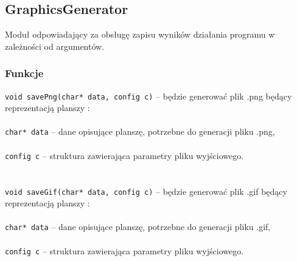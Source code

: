 \documentclass{article}
\begin{document}
\subsection{GraphicsGenerator}
Moduł odpowiadający za obsługę zapisu wyników działania programu w zależności od argumentów.

\subsubsection{Funkcje}
\texttt{void savePng(char* data, config c)} -- będzie generować plik .png będący reprezentacją planszy :\\\\
	 \hspace*{10mm}\texttt{char* data} -- dane opisujące planszę, potrzebne do generacji pliku .png,\\\\
	  \hspace*{10mm}\texttt{config c} -- struktura zawierająca parametry pliku wyjściowego.\\\\
\\
\texttt{void saveGif(char* data, config c)} -- będzie generować plik .gif będący reprezentacją planszy :\\\\
	 \hspace*{10mm}\texttt{char* data} -- dane opisujące planszę, potrzebne do generacji pliku .gif,\\\\
	  \hspace*{10mm}\texttt{config c} -- struktura zawierająca parametry pliku wyjściowego.\\\\
\\
\end{document}
